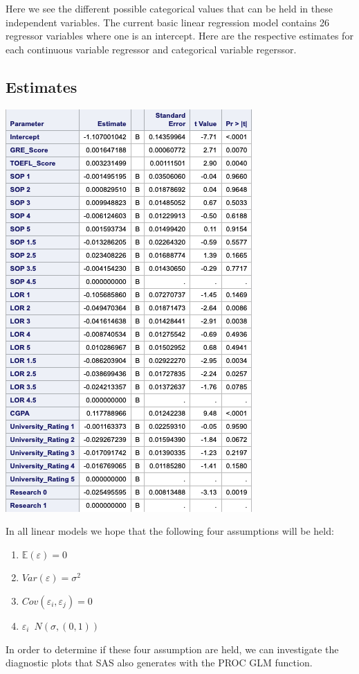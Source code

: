 \documentclass{article}
\begin{document}
Here we see the different possible categorical values that can be held in these independent variables. The current basic linear regression model contains 26 regressor variables where one is an intercept. Here are the respective estimates for each continuous variable regressor and categorical variable regerssor.

\subsection*{Estimates}

\includegraphics[scale=1]{Estimates.png}

In all linear models we hope that the following four assumptions will be held:

\begin{enumerate}

\item $\mathbb{E}(\varepsilon)=0$
\item $Var(\varepsilon)=\sigma^2$
\item $Cov(\varepsilon_i, \varepsilon_j)=0$
\item $\varepsilon_i$~$N(\sigma, (0,1))$


\end{enumerate}
In order to determine if these four assumption are held, we can investigate the diagnostic plots that SAS also generates with the PROC GLM function.
\end{document}
